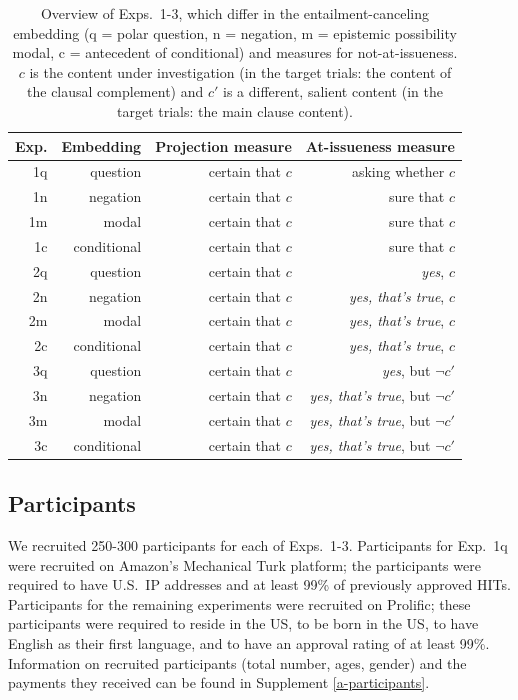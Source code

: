 \documentclass[11pt,fleqn]{article}
\newcommand{\6}{\mbox{$[\hspace*{-.6mm}[$}}
\newcommand{\9}{\mbox{$]\hspace*{-.6mm}]$}}
\begin{document}
\begin{table}[h!]
\centering
\begin{tabular}{r | r | r | r}

{\bf Exp.} & {\bf Embedding} & {\bf Projection measure} & {\bf At-issueness measure} \\ 
\hline
1q & question & certain that $c$ & asking whether $c$ \\
1n & negation & certain that $c$ & sure that $c$ \\
1m & modal & certain that $c$ & sure that $c$ \\
1c & conditional & certain that $c$ & sure that $c$ \\
\hline
2q & question & certain that $c$ & {\em yes}, $c$ \\ 
2n & negation & certain that $c$& {\em yes, that's true}, $c$ \\ 
2m & modal & certain that $c$& {\em yes, that's true}, $c$ \\ 
2c & conditional & certain that $c$& {\em yes, that's true}, $c$ \\ 
\hline
3q & question & certain that $c$& {\em yes}, but $\neg c'$ \\ 
3n & negation & certain that $c$& {\em yes, that's true}, but $\neg c'$ \\ 
3m & modal & certain that $c$& {\em yes, that's true}, but $\neg c'$ \\ 
3c & conditional & certain that $c$& {\em yes, that's true}, but $\neg c'$ \\ 
\hline
\end{tabular}
\caption{Overview of Exps.~1-3, which differ in the entailment-canceling embedding (q = polar question, n = negation, m = epistemic possibility modal, c = antecedent of conditional) and measures for not-at-issueness. $c$ is the content under investigation (in the target trials: the content of the clausal complement) and $c'$ is a different, salient content (in the target trials: the main clause content).}\label{t:overview}
\end{table}

\subsection{Participants}

We recruited 250-300 participants for each of Exps.~1-3. Participants for Exp.~1q were recruited on Amazon's Mechanical Turk platform; the participants were required to have U.S.\ IP addresses and at least 99\% of previously approved HITs. Participants for the remaining experiments were recruited on Prolific; these participants were required to reside in the US, to be born in the US, to have English as their first language, and to have an approval rating of at least 99\%. Information on recruited participants (total number, ages, gender) and the payments they received can be found in Supplement \ref{a-participants}.
\end{document}
